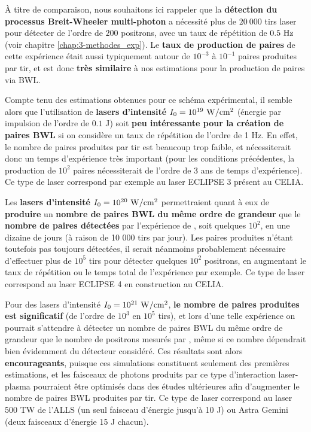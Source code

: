 \begin{refsection}
À titre de comparaison, nous souhaitons ici rappeler que la \textbf{détection du processus Breit-Wheeler multi-photon} \parencite{burke_1997} a nécessité plus de $20 ~ 000$ tirs laser pour détecter de l'ordre de $200$ positrons, avec un taux de répétition de $0.5 ~ \rm Hz$ (voir chapitre \ref{chap:3-methodes_exp}). Le \textbf{taux de production de paires} de cette expérience était aussi typiquement autour de $10^{-3}$ à $10^{-1}$ paires produites par tir, et est donc \textbf{très similaire} à nos estimations pour la production de paires via BWL. 

Compte tenu des estimations obtenues pour ce schéma expérimental, il semble alors que l'utilisation de \textbf{lasers d'intensité $I_0=10^{19} ~ \rm W/cm^2$} (énergie par impulsion de l'ordre de $0.1$ J) soit \textbf{peu intéressante pour la création de paires BWL} si on considère un taux de répétition de l'ordre de 1 Hz. En effet, le nombre de paires produites par tir est beaucoup trop faible, et nécessiterait donc un temps d'expérience très important (pour les conditions précédentes, la production de $10^2$ paires nécessiterait de l'ordre de 3 ans de temps d'expérience). Ce type de laser correspond par exemple au laser ECLIPSE 3 présent au CELIA.

Les \textbf{lasers d'intensité $I_0=10^{20} ~ \rm W/cm^2$} permettraient quant à eux de \textbf{produire} un \textbf{nombre de paires BWL du même ordre de grandeur} que le \textbf{nombre de paires détectées} par l'expérience de \cite{burke_1997}, soit quelques $10^2$, en une dizaine de jours (à raison de 10 000 tirs par jour). Les paires produites n'étant toutefois pas toujours détectées, il serait néanmoins probablement nécessaire d'effectuer plus de $10^5$ tirs pour détecter quelques $10^2$ positrons, en augmentant le taux de répétition ou le temps total de l'expérience par exemple. Ce type de laser correspond au laser ECLIPSE 4 en construction au CELIA. 

Pour des lasers d'intensité $I_0=10^{21} ~ \rm W/cm^2$, \textbf{le nombre de paires produites est significatif} (de l'ordre de $10^3$ en $10^5$ tirs), et lors d'une telle expérience on pourrait s'attendre à détecter un nombre de paires BWL du même ordre de grandeur que le nombre de positrons mesurés par \cite{burke_1997}, même si ce nombre dépendrait bien évidemment du détecteur considéré.
Ces résultats sont alors \textbf{encourageants}, puisque ces simulations constituent seulement des premières estimations, et les faisceaux de photons produits par ce type d'interaction laser-plasma pourraient être optimisés dans des études ultérieures afin d'augmenter le nombre de paires BWL produites par tir. Ce type de laser correspond au laser 500 TW de l'ALLS \parencite{laser_500tw} (un seul faisceau d'énergie jusqu'à 10 J) ou Astra Gemini \parencite{laser_gemini} (deux faisceaux d'énergie 15 J chacun).


\end{refsection}
